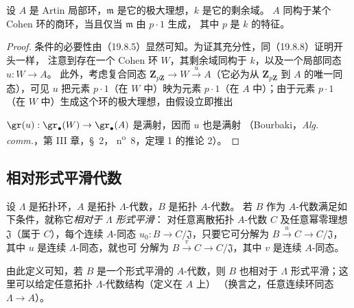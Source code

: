 \begin{proposition}[19.8.11]
\label{0.19.8.11-fr}
设 $A$ 是 Artin 局部环，$\mathfrak m$ 是它的极大理想，$k$ 是它的剩余域。
$A$ 同构于某个 Cohen 环的商环，当且仅当 $\mathfrak m$ 由 $p\cdot1$ 生成，
其中 $p$ 是 $k$ 的特征。
\end{proposition}

\begin{proof}
条件的必要性由（19.8.5）显然可知。为证其充分性，同（19.8.8）证明开头一样，
注意到存在一个 Cohen 环 $W$，其剩余域同构于 $k$，以及一个局部同态 $u:W\to A$。
此外，考虑复合同态
$\mathbf Z_{p\mathbf Z}\to W\xrightarrow{u}A$（它必为从
$\mathbf Z_{p\mathbf Z}$ 到 $A$ 的唯一同态），可见 $u$ 把元素
$p\cdot1$（在 $W$ 中）映为元素 $p\cdot1$（在 $A$ 中）；由于元素
$p\cdot1$（在 $W$ 中）生成这个环的极大理想，由假设立即推出


$\gr(u):\gr_\bullet(W)\to\gr_\bullet(A)$ 是满射，因而 $u$ 也是满射
（Bourbaki，\emph{Alg. comm.}，第 III 章，§~2，
n\textsuperscript{o}~8，定理 1 的推论 2）。
\end{proof}

\subsection{相对形式平滑代数}
\label{subsection:0.19.9-fr}

\begin{definition}[19.9.1]
\label{0.19.9.1-fr}
设 $\Lambda$ 是拓扑环，$A$ 是拓扑 $\Lambda$-代数，$B$ 是拓扑 $A$-代数。
若 $B$ 作为 $A$-代数满足如下条件，就称它\emph{相对于 $\Lambda$ 形式平滑}：
对任意离散拓扑 $A$-代数 $C$ 及任意幂零理想 $\mathfrak J$（属于 $C$），每个连续
$A$-同态 $u_0:B\to C/\mathfrak J$，只要它可分解为
$B\xrightarrow{u}C\to C/\mathfrak J$，其中 $u$ 是连续 $\Lambda$-同态，就也可
分解为 $B\xrightarrow{v}C\to C/\mathfrak J$，其中 $v$ 是连续 $A$-同态。
\end{definition}

由此定义可知，若 $B$ 是一个形式平滑的 $A$-代数，则 $B$ 也相对于
$\Lambda$ 形式平滑；这里可以给定任意拓扑 $\Lambda$-代数结构（定义在 $A$ 上）
（换言之，任意连续环同态 $\Lambda\to A$）。

